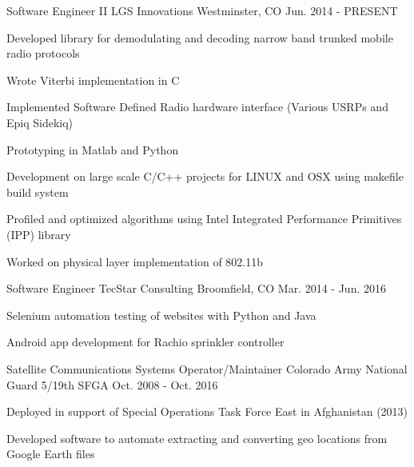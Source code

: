 

\begin{cventries}

  \cventry
    {Software Engineer II} %
    {LGS Innovations} %
    {Westminster, CO} %
    {Jun. 2014 - PRESENT} %
    {
      \begin{cvitems} %
        \item {Developed library for demodulating and decoding narrow band trunked mobile radio protocols}
        \item {Wrote Viterbi implementation in C}
        \item {Implemented Software Defined Radio hardware interface (Various USRPs and Epiq Sidekiq)}
        \item {Prototyping in Matlab and Python}
        \item {Development on large scale C/C++ projects for LINUX and OSX using makefile build system}
        \item {Profiled and optimized algorithms using Intel Integrated Performance Primitives (IPP) library}
        \item {Worked on physical layer implementation of 802.11b}
      \end{cvitems}
    }

  \cventry
    {Software Engineer} %
    {TecStar Consulting} %
    {Broomfield, CO} %
    {Mar. 2014 - Jun. 2016} %
    {
      \begin{cvitems} %
        \item {Selenium automation testing of websites with Python and Java}
        \item {Android app development for Rachio sprinkler controller}
      \end{cvitems}
    }

  \cventry
    {Satellite Communications Systems Operator/Maintainer} %
    {Colorado Army National Guard} %
    {5/19th SFGA} %
    {Oct. 2008 - Oct. 2016} %
    {
      \begin{cvitems} %
        \item {Deployed in support of Special Operations Task Force East in Afghanistan (2013)}
        \item {Developed software to automate extracting and converting geo locations from Google Earth files}
      \end{cvitems}
    }
    
\end{cventries}
